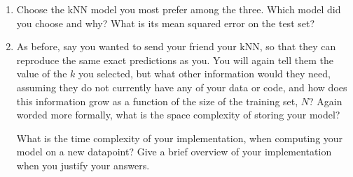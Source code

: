 \documentclass[submit]{harvardml}
\begin{document}
\begin{problem}
\begin{enumerate}
\item Choose the kNN model you most prefer among the three. Which model did you choose and why? What is its mean squared error on the test set?

\item As before, say you wanted to send your friend your kNN, so that they can reproduce the same exact predictions as you. You will again tell them the value of the $k$ you selected, but what other information would they need, assuming they do not currently have any of your data or code, and how does this information grow as a function of the size of the training set, $N$? Again worded more formally, what is the space complexity of storing your model?

What is the time complexity of your implementation, when computing your model on a new datapoint? Give a brief overview of your implementation when you justify your answers. 
\end{enumerate}

\end{problem}
\end{document}
